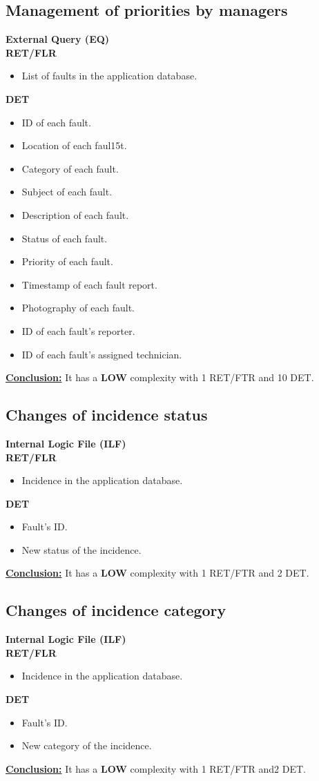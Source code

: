 \subsection{Management of priorities by managers}
\textbf{External Query (EQ)} \\ 
\textbf{RET/FLR}
\begin{itemize}
\item List of faults in the application database.
\end{itemize}
\textbf{DET}
\begin{itemize}
\item ID of each fault.
\item Location of each faul15t.
\item Category of each fault.
\item Subject of each fault.
\item Description of each fault.
\item Status of each fault.
\item Priority of each fault.
\item Timestamp of each fault report.
\item Photography of each fault.
\item ID of each fault's reporter.
\item ID of each fault's assigned technician.
\end{itemize}
\textbf{\underline{Conclusion:}} It has a \textbf{LOW} complexity with 1 RET/FTR and 10 DET.

\subsection{Changes of incidence status}
\textbf{Internal Logic File (ILF)} \\ 
\textbf{RET/FLR}
\begin{itemize}
\item Incidence in the application database.
\end{itemize}
\textbf{DET}
\begin{itemize}
\item Fault's ID.
\item New status of the incidence.
\end{itemize}
\textbf{\underline{Conclusion:}} It has a \textbf{LOW} complexity with 1 RET/FTR and 2 DET.

\subsection{Changes of incidence category}
\textbf{Internal Logic File (ILF)} \\ 
\textbf{RET/FLR}
\begin{itemize}
\item Incidence in the application database.
\end{itemize}
\textbf{DET}
\begin{itemize}
\item Fault's ID.
\item New category of the incidence.
\end{itemize}
\textbf{\underline{Conclusion:}} It has a \textbf{LOW} complexity with 1 RET/FTR and2 DET.

